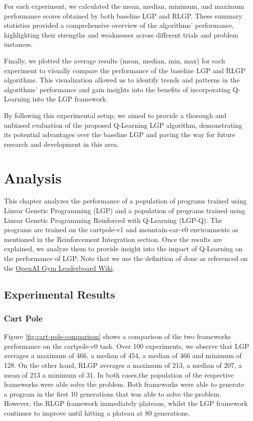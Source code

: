 \documentclass[12pt, final]{dalcsthesis}
\begin{document}
For each experiment, we calculated the mean, median, minimum, and maximum performance scores obtained by both baseline LGP and RLGP. These summary statistics provided a comprehensive overview of the algorithms' performance, highlighting their strengths and weaknesses across different trials and problem instances.

Finally, we plotted the average results (mean, median, min, max) for each experiment to visually compare the performance of the baseline LGP and RLGP algorithms. This visualization allowed us to identify trends and patterns in the algorithms' performance and gain insights into the benefits of incorporating Q-Learning into the LGP framework.

By following this experimental setup, we aimed to provide a thorough and unbiased evaluation of the proposed Q-Learning LGP algorithm, demonstrating its potential advantages over the baseline LGP and paving the way for future research and development in this area.

\chapter{Analysis}

This chapter analyzes the performance of a population of programs trained using Linear Genetic Programming (LGP)
and a population of programs trained using Linear Genetic Programming Reinforced with Q-Learning (LGP-Q). The programs
are trained on the cartpole-v1 and mountain-car-v0 environments \cite{1606.01540} as mentioned in the Reinforcement Integration section.
Once the results are explained, we analyze them to provide insight into the impact of Q-Learning on the performance of LGP. Note that we use the definition of done as referenced on the \href{https://github.com/openai/gym/wiki/Leaderboard}{OpenAI Gym Leaderboard Wiki}.

\section{Experimental Results}

\subsection{Cart Pole}

Figure \ref{fig:cart-pole-comparison} shows a comparison of the two frameworks performance on the cartpole-v0 task. Over 100 experiments, we observe that LGP averages a maximum of 466, a median of 454, a median of 466 and minimum of 128. On the other hand, RLGP
averages a maximum of 213, a median of 207, a mean of 213 a minimum of 31. In both cases,the population of the respective frameworks were able solve the problem. Both frameworks were able
to generate a program in the first 10 generations that was able to solve the problem. However, the RLGP framework immediately plateaus, whilst the LGP framework continues to improve until hitting a plateau at 80 generations.
\end{document}
